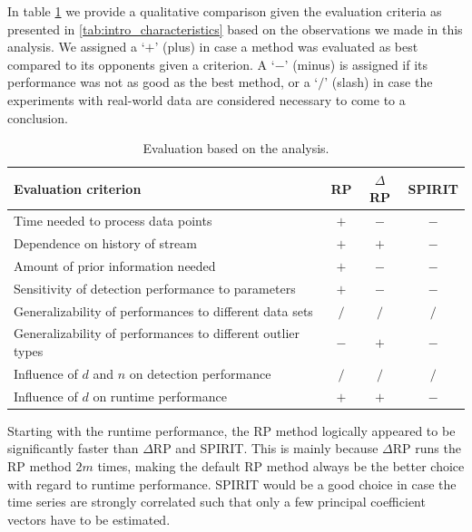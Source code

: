 In table \ref{tab:analysis_qualcomp} we provide a qualitative comparison given the evaluation criteria as presented in \ref{tab:intro_characteristics} based on the observations we made in this analysis. We assigned a `$+$' (plus) in case a method was evaluated as best compared to its opponents given a criterion. A `$-$' (minus) is assigned if its performance was not as good as the best method, or a `$/$' (slash) in case the experiments with real-world data are considered necessary to come to a conclusion.

\begin{table}[h]
	\centering
	\vspace{-0.05cm}
	\caption{Evaluation based on the analysis.}
	\label{tab:analysis_qualcomp}
	\begin{tabular}{l c c c}
		\toprule
		\textbf{Evaluation criterion} 		& \textbf{RP} 	& \textbf{$\Delta$RP} & \textbf{SPIRIT} \\ \midrule
		Time needed to process data points 	&  		$+$		&  		$-$		& $-$ \\[0.1cm]
		Dependence on history of stream 	& 		$+$		& 		$+$		& $-$ \\[0.1cm]
		Amount of prior information needed 	& 		$+$		& 		$-$		& $-$ \\[0.1cm]
		Sensitivity of detection performance to parameters 		&	$+$	& 	$-$ 	& $-$ \\
		\midrule
		Generalizability of performances to	different data sets & $/$ & $/$	& $/$ \\[0.1cm]
		Generalizability of performances to different outlier types & $-$	& $+$	& $-$\\
		\midrule
		Influence of $d$ and $n$ on detection performance 		& $/$ & $/$ & $/$ \\[0.1cm]
		Influence of $d$ on runtime	performance	& $+$ & $+$ & $-$ \\
		\bottomrule		
	\end{tabular}
\vspace{-0.1cm}
\end{table}

Starting with the runtime performance, the RP method logically appeared to be significantly faster than $\Delta$RP and SPIRIT. This is mainly because $\Delta$RP runs the RP method $2m$ times, making the default RP method always be the better choice with regard to runtime performance. SPIRIT would be a good choice in case the time series are strongly correlated such that only a few principal coefficient vectors have to be estimated.

